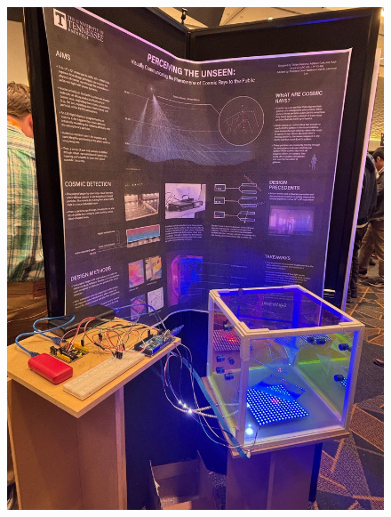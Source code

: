 \documentclass{article}
\begin{document}
\begin{figure}[h]
    \centering
  \begin{minipage}[b]{0.35\textwidth}
    \includegraphics[width=\textwidth]{images/unnamed14.jpg}
  \end{minipage}
  \hfill
  \begin{minipage}[b]{0.35\textwidth}

\end{minipage}
\end{figure}
\end{document}
